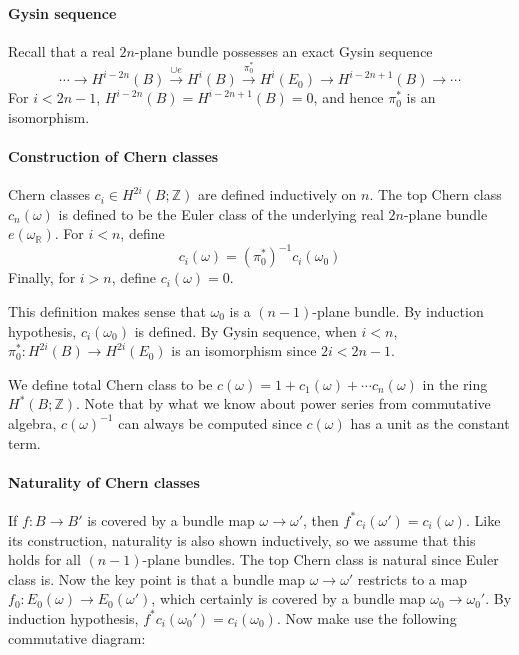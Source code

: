 \documentclass[12pt]{article}
\theoremstyle{plain}
\theoremstyle{definition}
\newcommand{\IR}{\mathbb{R}}
\newcommand{\IZ}{\mathbb{Z}}
\newcommand{\<}{\langle}
\renewcommand{\>}{\rangle}
\newcommand{\w}{\omega}
\begin{document}
\paragraph{Gysin sequence} Recall that a real $2n$-plane bundle possesses an exact Gysin sequence
$$ \cdots \longrightarrow H^{i - 2n}(B) \stackrel{\cup e}{\longrightarrow} H^i(B) \stackrel{\pi_0^*}{\longrightarrow} H^i(E_0) \longrightarrow H^{i - 2n + 1}(B) \longrightarrow \cdots $$
For $i < 2n - 1$, $H^{i - 2n}(B) = H^{i - 2n + 1}(B) = 0$, and hence $\pi_0^*$ is an isomorphism. 

\paragraph{Construction of Chern classes}
Chern classes $c_i \in H^{2i}(B; \IZ)$ are defined inductively on $n$. The top Chern class $c_n(\w)$ is defined to be the Euler class of the underlying real $2n$-plane bundle $e(\w_\IR)$. For $i < n$, define 
$$ c_i(\w) = (\pi^*_0)^{-1} c_i (\w_0)$$
Finally, for $i > n$, define $c_i(\w) = 0$. 

This definition makes sense that $\w_0$ is a $(n-1)$-plane bundle. By induction hypothesis, $c_i(\w_0)$ is defined. By Gysin sequence, when $i < n$, $\pi^*_0 : H^{2i}(B) \to H^{2i}(E_0)$ is an isomorphism since $2i < 2n - 1$. 

We define total Chern class to be $c(\w) = 1 + c_1(\w) + \cdots c_n(\w)$ in the ring $H^*(B; \IZ)$. Note that by what we know about power series from commutative algebra, $c(\w)^{-1}$ can always be computed since $c(\w)$ has a unit as the constant term. 

\paragraph{Naturality of Chern classes} If $f: B \to B'$ is covered by a bundle map $\w \to \w'$, then $f^* c_i(\w') = c_i(\w)$. Like its construction, naturality is also shown inductively, so we assume that this holds for all $(n -1)$-plane bundles. The top Chern class is natural since Euler class is. Now the key point is that a bundle map $\w \to \w'$ restricts to a map $f_0 : E_0(\w) \to E_0(\w')$, which certainly is covered by a bundle map $\w_0 \to \w_0'$. By induction hypothesis, $f^* c_i(\w_0') = c_i(\w_0)$. Now make use the following commutative diagram: 
\begin{center}
\end{center}
\end{document}
